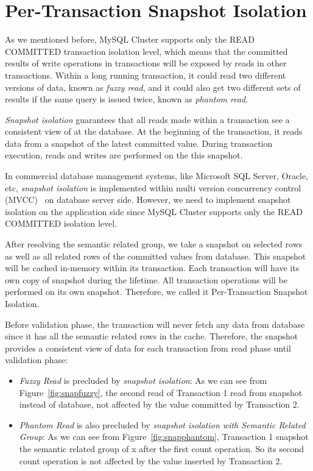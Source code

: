 \section{Per-Transaction Snapshot Isolation}

As we mentioned before, MySQL Cluster supports only the READ COMMITTED transaction isolation level, which means that the committed results of write operations in transactions will be exposed by reads in other transactions. Within a long running transaction, it could read two different versions of data, known as \textit{fuzzy read}, and it could also get two different sets of results if the same query is issued twice, known as \textit{phantom read}.

\noindent \textit{Snapshot isolation} guarantees that all reads made within a transaction see a consistent view of at the database. At the beginning of the transaction, it reads data from a snapshot of the latest committed value. During transaction execution, reads and writes are performed on the this snapshot.

\noindent In commercial database management systems, like Microsoft SQL Server, Oracle, etc, \textit{snapshot isolation} is implemented within multi version concurrency control (MVCC)~\cite{berenson1995critique} on database server side. However, we need to implement snapshot isolation on the application side since MySQL Cluster supports only the READ COMMITTED isolation level.

\noindent After resolving the semantic related group, we take a snapshot on selected rows as well as all related rows of the committed values from database. This snapshot will be cached in-memory within its transaction. Each transaction will have its own copy of snapshot during the lifetime. All transaction operations will be performed on its own snapshot. Therefore, we called it Per-Transaction Snapshot Isolation.

\noindent Before validation phase, the transaction will never fetch any data from database since it has all the semantic related rows in the cache. Therefore, the snapshot provides a consistent view of data for each transaction from read phase until validation phase: 
\begin{itemize}[noitemsep]
	\item \textit{Fuzzy Read} is precluded by \textit{snapshot isolation}: As we can see from Figure~\ref{fig:snapfuzzy}, the second read of Transaction 1 read from snapshot instead of database, not affected by the value committed by Transaction 2.
	
	\item \textit{Phantom Read} is also precluded by \textit{snapshot isolation with Semantic Related Group}: As we can see from Figure~\ref{fig:snapphantom}, Transaction 1 snapshot the semantic related group of x after the first count operation. So its second count operation is not affected by the value inserted by Transaction 2.
	
\end{itemize} 

